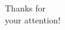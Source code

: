 \documentclass{beamer}
\begin{document}

\begin{frame}

\begin{center}
	\Huge Thanks for
	\\
	your attention!
\end{center}

\end{frame}

\end{document}
